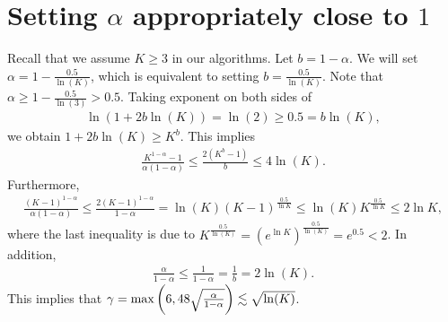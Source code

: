 \section{Setting $\alpha$ appropriately close to $1$}
\label{appendix:setAlphaCloseto1}
Recall that we assume $K \geq 3$ in our algorithms.
Let $b = 1 - \alpha$. We will set $\alpha = 1 - \frac{0.5}{\ln(K)}$, which is equivalent to setting $b = \frac{0.5}{\ln(K)}$. Note that $\alpha \geq 1 - \frac{0.5}{\ln(3)} > 0.5.$
Taking exponent on both sides of 
\begin{align}
    \ln(1 + 2b\ln(K)) = \ln(2) \geq 0.5 = b\ln(K),
\end{align} 
we obtain $1 + 2b\ln(K) \geq K^b$. This implies
\begin{align}
    \frac{K^{1-\alpha} - 1}{\alpha(1-\alpha)} \leq \frac{2(K^b - 1)}{b}\leq 4\ln(K).
\end{align}
Furthermore, 
\begin{align}
    \frac{(K-1)^{1-\alpha}}{\alpha(1-\alpha)} \leq \frac{2(K-1)^{1-\alpha}}{1-\alpha} = \ln(K)(K-1)^{\frac{0.5}{\ln{K}}} \leq \ln(K)K^{\frac{0.5}{\ln{K}}} \leq 2\ln{K},
\end{align}
where the last inequality is due to $K^{\frac{0.5}{\ln(K)}} = (e^{\ln{K}})^{\frac{0.5}{\ln(K)}} = e^{0.5} < 2$.
In addition,
\begin{align}
    \frac{\alpha}{1-\alpha} \leq \frac{1}{1-\alpha} = \frac{1}{b} = 2\ln(K).
\end{align}
This implies that $\gamma = \max\left(6, 48\sqrt{\frac{\alpha}{1-\alpha}}\right) \lesssim \sqrt{\ln(K)}$.


